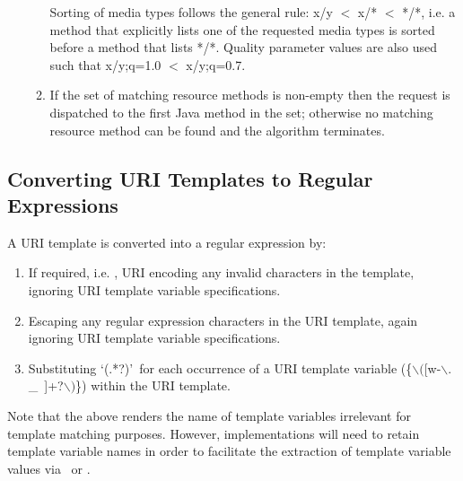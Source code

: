\begin{enumerate}
\begin{enumerate}
Sorting of media types follows the general rule: x/y $<$ x/* $<$ */*, i.e. a method that explicitly lists one of the requested media types is sorted before a method that lists */*. Quality parameter values are also used such that x/y;q=1.0 $<$ x/y;q=0.7.

\item \label{dispatch_method} If the set of matching resource methods is non-empty then the request is dispatched to the first Java method in the set; otherwise no matching resource method can be found and the algorithm terminates.
\end{enumerate}

\end{enumerate}

\subsection{Converting URI Templates to Regular Expressions}
\label{template_to_regex}

A URI template is converted into a regular expression by:
\begin{enumerate}
\item If required, i.e. \UriTemplate{}, URI encoding any invalid characters in the template, ignoring URI template variable specifications.
\item Escaping any regular expression characters in the URI template, again ignoring URI template variable specifications.
\item Substituting \lq(.*?)\rq\ for each occurrence of a URI template variable (\{$\backslash($[w-$\backslash.$\_~]+?$\backslash)$\}) within the URI template.
\end{enumerate}

Note that the above renders the name of template variables irrelevant for template matching purposes. However, implementations will need to retain template variable names in order to facilitate the extraction of template variable values via \UriParam\ or \UriInfo{}.